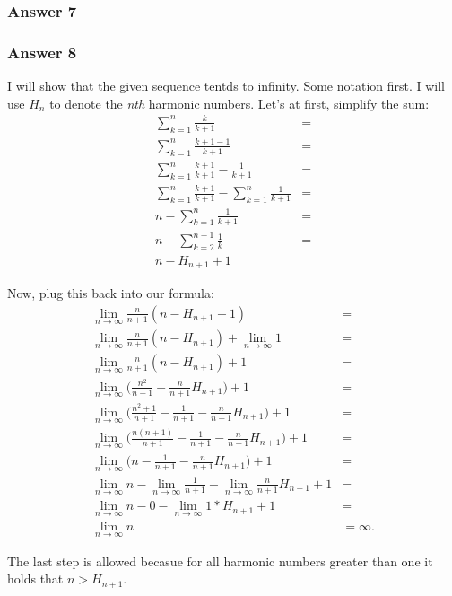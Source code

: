 \documentclass[11pt]{article}
\begin{document}
\subsubsection{Answer 7}
\label{sec-1-2-3}


\subsubsection{Answer 8}
\label{sec-1-2-4}
I will show that the given sequence tentds to infinity.  Some notation first.
I will use $H_n$ to denote the \emph{nth} harmonic numbers.  Let's
at first, simplify the sum:
\begin{equation*}
  \begin{aligned}
    \sum_{k=1}^n \frac{k}{k + 1} &= \\
    \sum_{k=1}^n \frac{k + 1 - 1}{k + 1} &= \\
    \sum_{k=1}^n \frac{k + 1}{k + 1} - \frac{1}{k + 1} &= \\
    \sum_{k=1}^n \frac{k + 1}{k + 1} - \sum_{k=1}^n \frac{1}{k + 1} &= \\
    n - \sum_{k=1}^n \frac{1}{k + 1} &= \\
    n - \sum_{k=2}^{n+1} \frac{1}{k} &= \\
    n - H_{n+1} + 1
  \end{aligned}
\end{equation*}

Now, plug this back into our formula:
\begin{equation*}
  \begin{aligned}
    \lim_{n \to \infty} \frac{n}{n + 1} (n - H_{n+1} + 1) &= \\
    \lim_{n \to \infty} \frac{n}{n + 1} (n - H_{n+1}) + \lim_{n \to \infty}1 &= \\
    \lim_{n \to \infty} \frac{n}{n + 1} (n - H_{n+1}) + 1 &= \\
    \lim_{n \to \infty} \Big( \frac{n^2}{n + 1} - \frac{n}{n + 1} H_{n+1} \Big) + 1 &= \\
    \lim_{n \to \infty} \Big( \frac{n^2 + 1}{n + 1} - \frac{1}{n + 1} -
    \frac{n}{n + 1} H_{n+1} \Big) + 1 &= \\
    \lim_{n \to \infty} \Big( \frac{n(n + 1)}{n + 1} - \frac{1}{n + 1} -
    \frac{n}{n + 1} H_{n+1} \Big) + 1 &= \\
    \lim_{n \to \infty} \Big( n - \frac{1}{n + 1} - \frac{n}{n + 1} H_{n+1} \Big) + 1 &= \\
    \lim_{n \to \infty} n - \lim_{n \to \infty} \frac{1}{n + 1} -
    \lim_{n \to \infty} \frac{n}{n + 1} H_{n+1} + 1 &= \\
    \lim_{n \to \infty} n - 0 - \lim_{n \to \infty} 1 * H_{n+1} + 1 &= \\
    \lim_{n \to \infty} n &= \infty.
  \end{aligned}
\end{equation*}

The last step is allowed becasue for all harmonic numbers greater than one
it holds that $n > H_{n+1}$.
\end{document}
